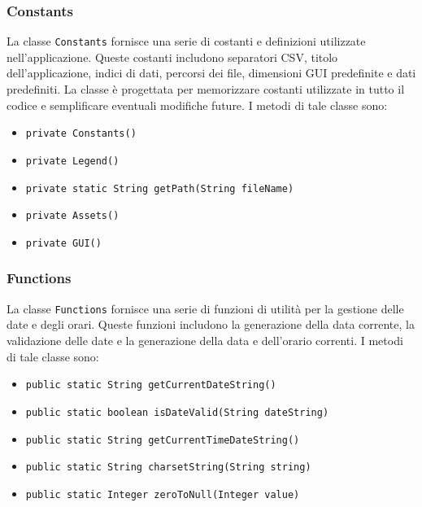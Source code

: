 \subsubsection{Constants}
La classe \texttt{Constants} fornisce una serie di costanti e definizioni utilizzate nell'applicazione.
Queste costanti includono separatori CSV, titolo dell'applicazione, indici di dati, percorsi dei file, dimensioni GUI predefinite e dati predefiniti.
La classe è progettata per memorizzare costanti utilizzate in tutto il codice e semplificare eventuali modifiche future.
I metodi di tale classe sono:
\begin{itemize}
    \item \texttt{private Constants()}
    \item \texttt{private Legend()}
    \item \texttt{private static String getPath(String fileName)}
    \item \texttt{private Assets()}
    \item \texttt{private GUI()}
\end{itemize}

\subsubsection{Functions}
La classe \texttt{Functions} fornisce una serie di funzioni di utilità per la gestione delle date e degli orari.
Queste funzioni includono la generazione della data corrente, la validazione delle date e la generazione della data e dell'orario correnti.
I metodi di tale classe sono:
\begin{itemize}
    \item \texttt{public static String getCurrentDateString()}
    \item \texttt{public static boolean isDateValid(String dateString)}
    \item \texttt{public static String getCurrentTimeDateString()}
    \item \texttt{public static String charsetString(String string)}
    \item \texttt{public static Integer zeroToNull(Integer value)}
\end{itemize}

